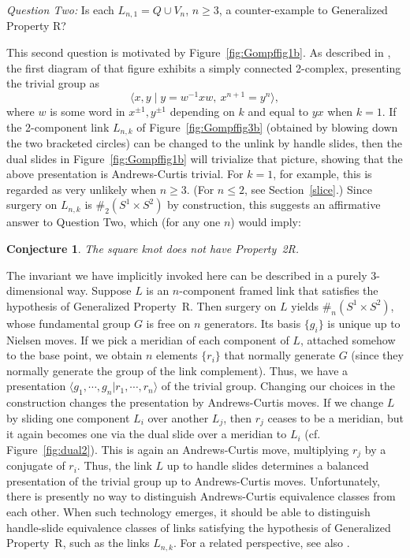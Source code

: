 \documentclass{amsart}
\newtheorem{conj}{Conjecture}
\begin{document}
\bigskip

{\em Question Two:}  Is each $L_{n,1} = Q \cup V_n$, $n \geq 3$, a counter-example to Generalized Property R?

\bigskip

This second question is motivated by Figure~\ref{fig:Gompffig1b}. As described in \cite{Go1}, the first diagram of that figure exhibits a simply connected 2-complex, presenting the trivial group as
 $$\langle x, y \; | \; y = w^{-1} x w,\  x^{n+1} = y^n \rangle,$$
 where $w$ is some word in $x^{\pm 1},y^{\pm 1}$ depending on $k$ and equal to $yx$ when $k=1$. If the 2-component link $L_{n,k}$ of Figure~\ref{fig:Gompffig3b} (obtained by blowing down the two bracketed circles) can be changed to the unlink by handle slides, then the dual slides in Figure~\ref{fig:Gompffig1b} will trivialize that picture, showing that the above presentation is Andrews-Curtis trivial.  For $k=1$, for example, this is regarded as very unlikely when $n \geq 3$. (For $n\le 2$, see Section~\ref{slice}.) Since surgery on $L_{n,k}$ is $\#_2(S^1\times S^2)$ by construction, this suggests an affirmative answer to Question Two, which (for any one $n$) would imply:


\bigskip

\begin{conj} \label{conj:not2R} The square knot does not have Property~2R.
\end{conj}

The invariant we have implicitly invoked here can be described in a purely 3-dimensional way.  Suppose $L$ is an $n$-component framed link that satisfies the hypothesis of Generalized Property~R. Then surgery on $L$ yields $\#_n(S^1\times S^2)$, whose fundamental group $G$ is free on $n$ generators. Its basis $\{g_i\}$ is unique up to Nielsen moves. If we pick a meridian of each component of $L$, attached somehow to the base point, we obtain $n$ elements $\{r_i\}$ that normally generate $G$ (since they normally generate the group of the link complement). Thus, we have a presentation $\langle g_1,\cdots,g_n| r_1,\cdots,r_n\rangle$ of the trivial group. Changing our choices in the construction changes the presentation by Andrews-Curtis moves. If we change $L$ by sliding one component $L_i$ over another $L_j$, then $r_j$ ceases to be a meridian, but it again becomes one via the dual slide over a meridian to $L_i$ (cf. Figure~\ref{fig:dual2}). This is again an Andrews-Curtis move, multiplying $r_j$ by a conjugate of $r_i$. Thus, the link $L$ up to handle slides determines a balanced presentation of the trivial group up to Andrews-Curtis moves.  Unfortunately, there is presently no way to distinguish Andrews-Curtis equivalence classes from each other. When such technology emerges, it should be able to distinguish handle-slide equivalence classes of links satisfying the hypothesis of Generalized Property~R, such as the links $L_{n,k}$.   For a related perspective, see also \cite{CL}.
\end{document}
